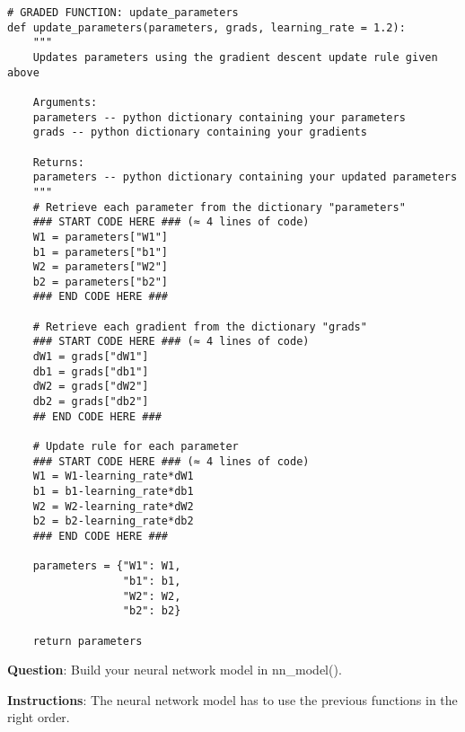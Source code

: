 \begin{verbatim}
# GRADED FUNCTION: update_parameters
def update_parameters(parameters, grads, learning_rate = 1.2):
    """
    Updates parameters using the gradient descent update rule given above
    
    Arguments:
    parameters -- python dictionary containing your parameters 
    grads -- python dictionary containing your gradients 
    
    Returns:
    parameters -- python dictionary containing your updated parameters 
    """
    # Retrieve each parameter from the dictionary "parameters"
    ### START CODE HERE ### (≈ 4 lines of code)
    W1 = parameters["W1"]
    b1 = parameters["b1"]
    W2 = parameters["W2"]
    b2 = parameters["b2"]
    ### END CODE HERE ###

    # Retrieve each gradient from the dictionary "grads"
    ### START CODE HERE ### (≈ 4 lines of code)
    dW1 = grads["dW1"]
    db1 = grads["db1"]
    dW2 = grads["dW2"]
    db2 = grads["db2"]
    ## END CODE HERE ###
    
    # Update rule for each parameter
    ### START CODE HERE ### (≈ 4 lines of code)
    W1 = W1-learning_rate*dW1
    b1 = b1-learning_rate*db1
    W2 = W2-learning_rate*dW2
    b2 = b2-learning_rate*db2
    ### END CODE HERE ###
    
    parameters = {"W1": W1,
                  "b1": b1,
                  "W2": W2,
                  "b2": b2}
    
    return parameters
\end{verbatim}




{\textbf {Question}}: Build your neural network model in nn\_model().

{\textbf {Instructions}}: The neural network model has to use the previous functions in the right order.


